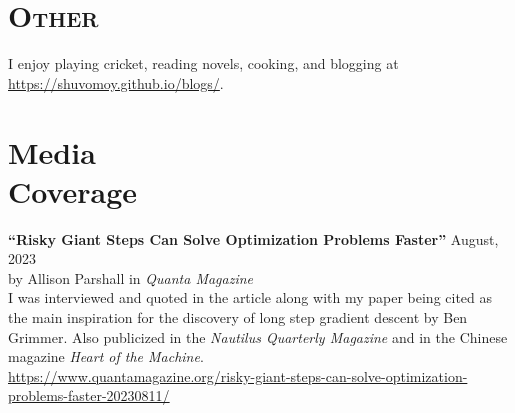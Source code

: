 \documentclass[margin,line,pifont]{./FontsAndCls/custom_res}
\begin{document}
\begin{resume}
\begin{minipage}{\textwidth}
\section{ \bfseries\scshape Other}
I enjoy playing cricket, reading novels, cooking, and blogging at \url{https://shuvomoy.github.io/blogs/}.


\end{minipage}

\section{\sc Media \\ Coverage}

\textbf{``Risky Giant Steps Can Solve Optimization Problems Faster''} \hfill August, 2023 \\
by Allison Parshall in \textit{Quanta Magazine} \\
I was interviewed and quoted in the article along with my paper being cited as the main inspiration for the discovery of long step gradient descent by   Ben Grimmer. Also publicized in the \textit{Nautilus Quarterly Magazine} and in the Chinese magazine 
\textit{Heart of the Machine}.\\
{} \url{https://www.quantamagazine.org/risky-giant-steps-can-solve-optimization-problems-faster-20230811/} \\

 


\end{resume}
\end{document}
